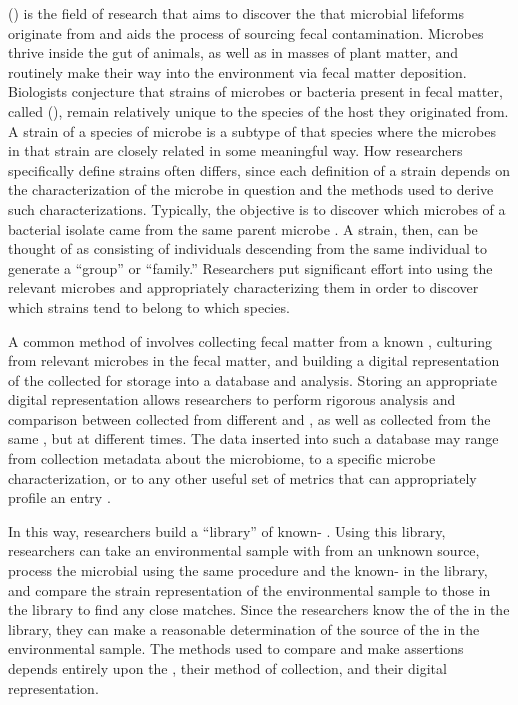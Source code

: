 \MSTlong{} (\mst{}) is the field of research that aims to discover the \spec{} that microbial lifeforms originate from
and
aids the process of sourcing fecal contamination. 
Microbes thrive inside the gut of animals, as well as in masses of plant matter, and routinely make their way into the environment via fecal matter deposition.
Biologists conjecture that strains of microbes or bacteria present in fecal matter, called \fiblong{} (\fib{}), remain relatively unique to the species of the host they originated from.
A strain of a species of microbe is a subtype of that species where the microbes in that strain are closely related in some meaningful way.
How researchers specifically define strains often differs, since each definition of a strain depends on the characterization of the microbe in question and the methods used to derive such characterizations.
Typically, the objective is to discover which microbes of a bacterial isolate came from the same parent microbe \cite{Li892}.
A strain, then, can be thought of as consisting of individuals descending from the same individual to generate a ``group'' or ``family.''
Researchers put significant effort into using the relevant microbes and appropriately characterizing them in order to discover which strains tend to belong to which species.

A common method of \mst{} involves collecting fecal matter from a known \spec{}, culturing \isols{} from relevant microbes in the fecal matter, and building a digital representation of the collected \isols{} for storage into a database and analysis.
Storing an appropriate digital representation allows researchers to perform rigorous analysis and comparison between \fib{} \isols{} collected from different \hosts{} and \spec{}, as well as \isols{} collected from the same \host{}, but at different times.
The data inserted into such a database may range from collection metadata about the microbiome, to a specific microbe characterization, or to any other useful set of metrics that can appropriately profile an entry \cite{ritter2003assessment}.

In this way, researchers build a ``library'' of known-\spec{} \isols{}.
Using this library, researchers can take an environmental sample with \fib{} from an unknown source, process the microbial \isols{} using the same procedure and the known-\spec{} \isols{} in the library, and compare the strain representation of the environmental sample to those in the library to find any close matches.
Since the researchers know the \spec{} of the \isols{} in the library, they can make a reasonable determination of the source of the \isols{} in the environmental sample.
The methods used to compare \isols{} and make assertions depends entirely upon the \fib{}, their method of collection, and their digital representation.

